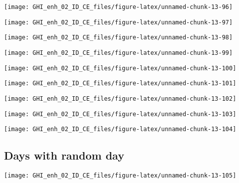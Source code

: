 \documentclass[
  10pt,
  a4paper,oneside]{article}
\begin{document}
\begin{center}\texttt{[image: GHI\_enh\_02\_ID\_CE\_files/figure-latex/unnamed-chunk-13-96]} \end{center}

\begin{center}\texttt{[image: GHI\_enh\_02\_ID\_CE\_files/figure-latex/unnamed-chunk-13-97]} \end{center}

\begin{center}\texttt{[image: GHI\_enh\_02\_ID\_CE\_files/figure-latex/unnamed-chunk-13-98]} \end{center}

\begin{center}\texttt{[image: GHI\_enh\_02\_ID\_CE\_files/figure-latex/unnamed-chunk-13-99]} \end{center}

\begin{center}\texttt{[image: GHI\_enh\_02\_ID\_CE\_files/figure-latex/unnamed-chunk-13-100]} \end{center}

\begin{center}\texttt{[image: GHI\_enh\_02\_ID\_CE\_files/figure-latex/unnamed-chunk-13-101]} \end{center}

\begin{center}\texttt{[image: GHI\_enh\_02\_ID\_CE\_files/figure-latex/unnamed-chunk-13-102]} \end{center}

\begin{center}\texttt{[image: GHI\_enh\_02\_ID\_CE\_files/figure-latex/unnamed-chunk-13-103]} \end{center}

\begin{center}\texttt{[image: GHI\_enh\_02\_ID\_CE\_files/figure-latex/unnamed-chunk-13-104]} \end{center}

\FloatBarrier

\hypertarget{days-with-random-day}{%
\subsection{Days with random day}\label{days-with-random-day}}

\begin{center}\texttt{[image: GHI\_enh\_02\_ID\_CE\_files/figure-latex/unnamed-chunk-13-105]} \end{center}
\end{document}
